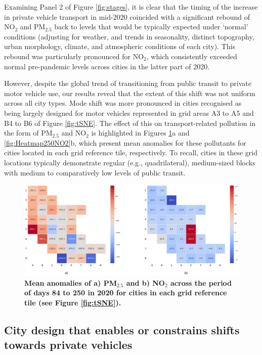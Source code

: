 \documentclass[preprint,10pt]{elsarticle} %
\begin{document}
Examining Panel 2 of Figure \ref{fig:stages}, it is clear that the timing of the increase in private vehicle transport in mid-2020 coincided with a significant rebound of NO$_{2}$ and PM$_{2.5}$ back to levels that would be typically expected under `normal' conditions (adjusting for weather, and trends in seasonality, distinct topography, urban morphology, climate, and atmospheric conditions of each city\cite{Wijnands2022}). This rebound was particularly pronounced for NO$_{2}$, which consistently exceeded normal pre-pandemic levels across cities in the latter part of 2020.

However, despite the global trend of transitioning from public transit to private motor vehicle use\cite{fernando2023shaping}, our results reveal that the extent of this shift was not uniform across all city types. Mode shift  was more pronounced in cities recognised as being largely designed for motor vehicles\cite{Thompson2020} represented in grid areas A3 to A5 and B4 to B6 of Figure \ref{fig:tSNE}. The effect of this on transport-related pollution in the form of PM$_{2.5}$ and NO$_{2}$ is highlighted in Figures \ref{fig:Heatmap250PM}a and \ref{fig:Heatmap250NO2}b, which present mean anomalies for these pollutants for cities located in each grid reference tile, respectively. To recall, cities in these grid locations typically demonstrate regular (e.g., quadrilateral), medium-sized blocks with medium to comparatively low levels of public transit.

\begin{figure}
\centering
\includegraphics[trim={0 0 0 0},clip,scale=0.25]{Images/pm25Anomaly250_no2Reduction7Ave7Ave250.png}
\caption{\bf Mean anomalies of a) PM$_{2.5}$ and b) NO$_{2}$ across the period of days 84 to 250 in 2020 for cities in each grid reference tile (see Figure \ref{fig:tSNE}).}  
 \label{fig:Heatmap250NO2}\label{fig:Heatmap250PM}
\end{figure}

\subsection*{City design that enables or constrains shifts towards private vehicles}
\end{document}
